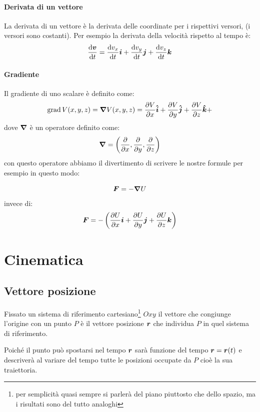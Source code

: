 \subsubsection{Derivata di un vettore}
La derivata di un vettore è la derivata delle coordinate per i rispettivi versori, (i versori sono costanti). Per esempio la derivata della velocità rispetto al tempo è:
\[\frac{\mathrm{d}\boldsymbol{v}}{\mathrm{d} t}=\frac{\mathrm{d} v_x}{\mathrm{d} t}\boldsymbol{i}+\frac{\mathrm{d} v_y}{\mathrm{d} t}\boldsymbol{j}+\frac{\mathrm{d} v_z}{\mathrm{d} t}\boldsymbol{k}\]

\subsubsection{Gradiente}
\label{gradiente}
Il gradiente di uno scalare è definito come:
\[
  \operatorname{grad} V(x,y,z)=\boldsymbol{\nabla} V(x,y,z)=\frac{\partial V}{\partial x}\boldsymbol{\hat {i}} + \frac{\partial V}{\partial y}\boldsymbol{\hat {j}} +\frac{\partial V}{\partial z}\boldsymbol{\hat {k}} +
\]
dove $\boldsymbol{\nabla}$ è un operatore definito come:
\[
  \boldsymbol{\nabla}=\left(\frac{\partial}{\partial x},\frac{\partial}{\partial y},\frac{\partial }{\partial z}\right)
\]
con questo operatore abbiamo il divertimento di scrivere le nostre formule per esempio in questo modo:

\[
  \boldsymbol{F}=-\boldsymbol{\nabla} U
\]
invece di:
\[
  \boldsymbol{F}=-\left(\frac{\partial U}{\partial
    x}\boldsymbol{i}+\frac{\partial U}{\partial y}\boldsymbol{j}+\frac{\partial
    U}{\partial z}\boldsymbol{k}\right)
\]

\chapter{Cinematica}
\minitoc
\section{Vettore posizione}
\begin{Def}
  Fissato un sistema di riferimento cartesiano\footnote{per semplicità quasi sempre si parlerà del piano piuttosto che dello spazio, ma i risultati sono del tutto analoghi} $Oxy$ il vettore che congiunge l'origine con un punto $P$ è il vettore posizione $\boldsymbol{r}$ che individua $P$ in quel sistema di riferimento.
\end{Def}
Poiché il punto può spostarsi nel tempo $\boldsymbol{r}$ sarà funzione del tempo $\boldsymbol{r}=\boldsymbol{r}(t)$ e descriverà al variare del tempo tutte le posizioni occupate da $P$ cioè la sua traiettoria.

